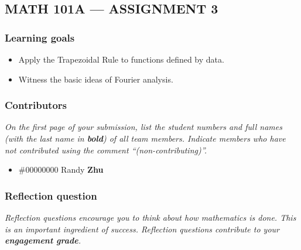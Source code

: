 \documentclass{exam}
\begin{document}
\subsection*{MATH 101A --- ASSIGNMENT 3}

\subsubsection*{Learning goals}
\begin{itemize}
    \setlength\itemsep{0.1em}
    \item Apply the Trapezoidal Rule to functions defined by data.
    \item Witness the basic ideas of Fourier analysis.
\end{itemize}

\subsubsection*{Contributors}

\textit{On the first page of your submission, list the student numbers and full names (with the last name in \textbf{bold}) of all team members. Indicate members who have not contributed using the comment ``(non-contributing)''.}

\begin{itemize}
    \item \#00000000 Randy {\bf Zhu}
\end{itemize}

\subsubsection*{Reflection question}

\textit{Reflection questions encourage you to think about how mathematics is done. This is an important ingredient of success. Reflection questions contribute to your \textbf{engagement grade}.}
\end{document}
